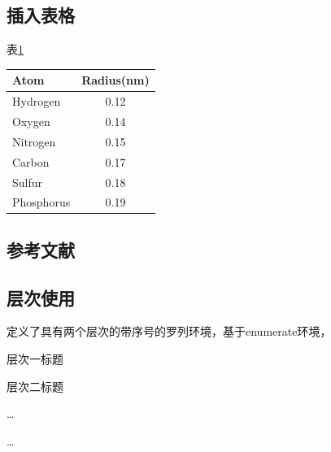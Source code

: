 \documentclass[twoside,maketable]{cauthesis}
\begin{document}
    \subsection{插入表格}
    表\ref{tab:1}%
    \begin{table}[H]
        \centering
        \begin{tabular}{lc}
            \hline
            Atom&Radius(nm)\\
            \hline
            Hydrogen&0.12\\
            Oxygen&0.14\\
            Nitrogen&0.15\\
            Carbon&0.17\\
            Sulfur&0.18\\
            Phosphorus&0.19\\
            \hline
        \end{tabular}
        \label{tab:1}%
    \end{table}

    \subsection{参考文献}
    \cite{王夫之1845--}\cite{KENNEDY1975-339-360}%
    \nocite{汪昂1881--}%

    \subsection{层次使用}
    定义了具有两个层次的带序号的罗列环境，基于enumerate环境，
    \begin{level}{1}
        \item 层次一标题
        \begin{level}{2}
            \item 层次二标题
            \item \ldots
        \end{level}
        \item \ldots
    \end{level}
    
\end{document}
